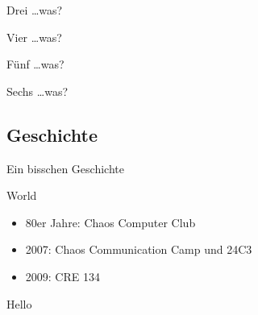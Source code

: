 \documentclass[hyperref={pdfpagelabels=false}]{beamer}
\begin{document}
\begin{frame}[label=secmatetags]{Drei \dots was?}
    \begin{figure}
    \end{figure}
\end{frame}

\begin{frame}[label=secpony]{Vier \dots was?}
    \begin{figure}
    \end{figure}
\end{frame}

\begin{frame}[label=secreprap]{Fünf \dots was?}
    \begin{figure}
    \end{figure}
\end{frame}

\begin{frame}[label=secinvaders]{Sechs \dots was?}
    \begin{figure}
    \end{figure}
\end{frame}

\subsection{Geschichte}

\begin{frame}[label=secgeschichte]{Ein bisschen Geschichte}
    \begin{block}{World}
        \begin{itemize}
            \item 80er Jahre: Chaos Computer Club
            \item 2007: Chaos Communication Camp und 24C3
                \cite{Ohlig2007}
            \item 2009: CRE 134 \cite{Pritlove2009}
        \end{itemize}
    \end{block}
    \pause
    \begin{block}{Hello}
        \begin{center}
        \end{center}
    \end{block}
\end{frame}
\end{document}
